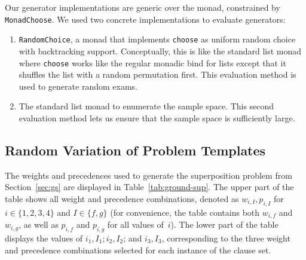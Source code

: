 Our generator implementations are generic over the monad, constrained by \texttt{MonadChoose}.
We used two concrete implementations to evaluate generators:
\begin{enumerate}
    \item
        \texttt{RandomChoice}, a monad that implements \texttt{choose}
        as uniform random choice with backtracking support.
        Conceptually, this is like the standard list monad
        where \texttt{choose} works like the regular monadic bind for lists
        except that it shuffles the list with a random permutation first.
        This evaluation method is used to generate random exams.
    \item
        The standard list monad to enumerate the sample space.
        This second evaluation method lets us ensure that the sample space is sufficiently large.
\end{enumerate}

\subsection{Random Variation of Problem Templates}

The weights and precedences used to generate the superposition problem
from Section~\ref{sec:gs}
are displayed in Table~\ref{tab:ground-sup}.
The upper part of the table shows all weight and precedence combinations,
denoted as $w_{i, I}, p_{i, I}$ for $i \in \{1, 2, 3, 4\}$
and $I \in \{f, g\}$ (for convenience, the table contains both $w_{i, f}$
and $w_{i, g}$, as well as $p_{i, f}$ and $p_{i, g}$ for all values of~$i$).
The lower part of the table displays the values of $i_1, I_1; i_2, I_2$; and $i_3, I_3$,
corresponding to the three weight and precedence combinations selected for
each instance of the clause set.

